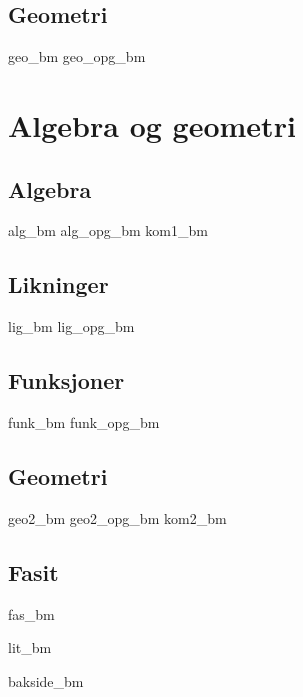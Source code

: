 \chapter{Geometri \label{Geometri}}
\newpage
{geo_bm}
{geo_opg_bm}

\part{Algebra og geometri \label{Del2}}
\chapter{Algebra \label{Algebra}}
\newpage
{alg_bm}
{alg_opg_bm}
\newpage
{kom1_bm}

\chapter{Likninger \label{Likningar}}
\newpage
{lig_bm}
{lig_opg_bm}

\chapter{Funksjoner \label{Funksjoner}}
{funk_bm}
{funk_opg_bm}

\chapter{Geometri \label{Geometri2}}
\newpage
{geo2_bm}
{geo2_opg_bm}
\newpage
{kom2_bm}

\newpage
{}
{}
\chapter*{Fasit}
{fas_bm}

{lit_bm}
{\printindex {}
	}
{bakside_bm}









